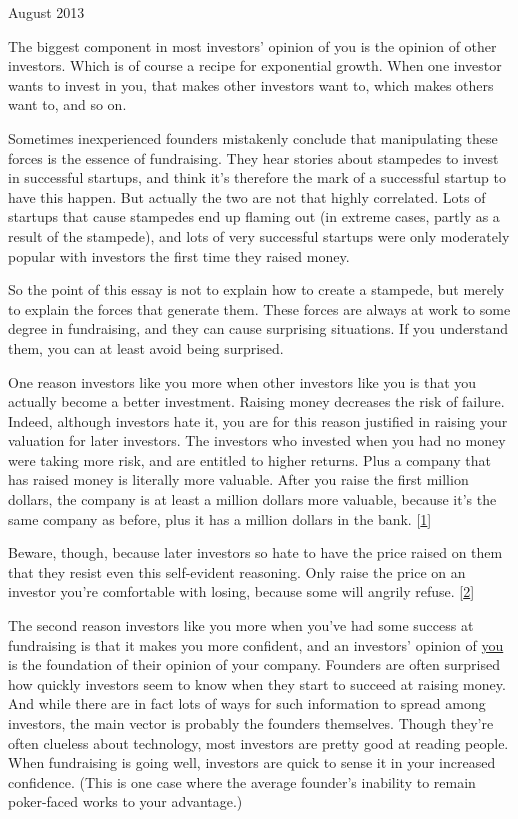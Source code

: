 August 2013

The biggest component in most investors' opinion of you is the opinion
of other investors. Which is of course a recipe for exponential growth.
When one investor wants to invest in you, that makes other investors
want to, which makes others want to, and so on.

Sometimes inexperienced founders mistakenly conclude that manipulating
these forces is the essence of fundraising. They hear stories about
stampedes to invest in successful startups, and think it's therefore the
mark of a successful startup to have this happen. But actually the two
are not that highly correlated. Lots of startups that cause stampedes
end up flaming out (in extreme cases, partly as a result of the
stampede), and lots of very successful startups were only moderately
popular with investors the first time they raised money.

So the point of this essay is not to explain how to create a stampede,
but merely to explain the forces that generate them. These forces are
always at work to some degree in fundraising, and they can cause
surprising situations. If you understand them, you can at least avoid
being surprised.

One reason investors like you more when other investors like you is that
you actually become a better investment. Raising money decreases the
risk of failure. Indeed, although investors hate it, you are for this
reason justified in raising your valuation for later investors. The
investors who invested when you had no money were taking more risk, and
are entitled to higher returns. Plus a company that has raised money is
literally more valuable. After you raise the first million dollars, the
company is at least a million dollars more valuable, because it's the
same company as before, plus it has a million dollars in the bank.
{[}\hyperref[f1n]{1}{]}

Beware, though, because later investors so hate to have the price raised
on them that they resist even this self-evident reasoning. Only raise
the price on an investor you're comfortable with losing, because some
will angrily refuse. {[}\hyperref[f2n]{2}{]}

The second reason investors like you more when you've had some success
at fundraising is that it makes you more confident, and an investors'
opinion of \href{convince.html}{you} is the foundation of their opinion
of your company. Founders are often surprised how quickly investors seem
to know when they start to succeed at raising money. And while there are
in fact lots of ways for such information to spread among investors, the
main vector is probably the founders themselves. Though they're often
clueless about technology, most investors are pretty good at reading
people. When fundraising is going well, investors are quick to sense it
in your increased confidence. (This is one case where the average
founder's inability to remain poker-faced works to your advantage.)


